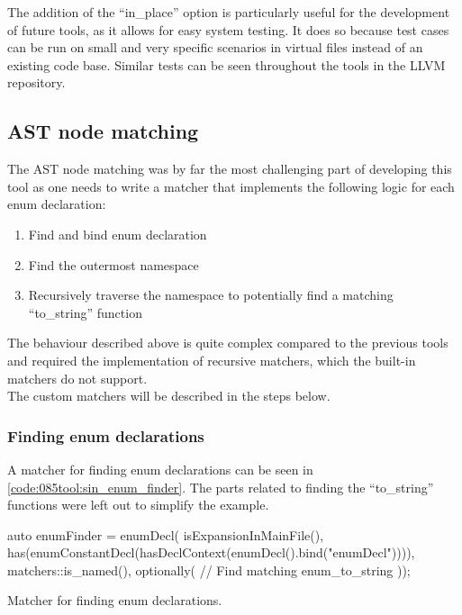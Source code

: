 The addition of the ``in\_place'' option is particularly useful for the development of future tools, as it allows for easy system testing. It does so because test cases can be run on small and very specific scenarios in virtual files instead of an existing code base.
Similar tests can be seen throughout the tools in the LLVM repository.

\subsection{AST node matching}\label{subsec:085tool:enum_node_matching_sin}

The AST node matching was by far the most challenging part of developing this tool as one needs to write a matcher that implements the following logic for each enum declaration:

\vspace*{-0.75em}
\begin{enumerate}
    \item Find and bind enum declaration
    \item Find the outermost namespace
    \item Recursively traverse the namespace to potentially find a matching ``to\_string'' function
\end{enumerate}

The behaviour described above is quite complex compared to the previous tools and required the implementation of recursive matchers, which the built-in matchers do not support. \\
The custom matchers will be described in the steps below.

\subsubsection*{Finding enum declarations}
A matcher for finding enum declarations can be seen in \cref{code:085tool:sin_enum_finder}. The parts related to finding the ``to\_string'' functions were left out to simplify the example.

\begin{listing}[H]
    \begin{cppcode}
auto enumFinder = enumDecl(
        isExpansionInMainFile(),
        has(enumConstantDecl(hasDeclContext(enumDecl().bind("enumDecl")))),
        matchers::is_named(),
        optionally(
            // Find matching enum_to_string
        ));
    \end{cppcode}
    \caption{Matcher for finding enum declarations.}
    \label{code:085tool:sin_enum_finder}
\end{listing}

